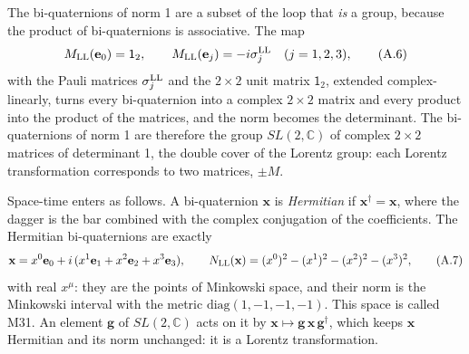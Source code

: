 \documentclass[
  10pt,
]{article}
\begin{document}
The bi-quaternions of norm 1 are a subset of the loop that \emph{is} a
group, because the product of bi-quaternions is associative. The map
\[M_{\rm LL}(\mathbf e_0)=\mathsf 1_2,\qquad M_{\rm LL}(\mathbf e_j)=-i\sigma^{\rm LL}_j\quad(j=1,2,3),\tag{A.6}\]
with the Pauli matrices \(\sigma^{\rm LL}_j\) and the \(2\times2\) unit
matrix \(\mathsf 1_2\), extended complex-linearly, turns every
bi-quaternion into a complex \(2\times2\) matrix and every product into
the product of the matrices, and the norm becomes the determinant. The
bi-quaternions of norm 1 are therefore the group \(SL(2,\mathbb C)\) of
complex \(2\times2\) matrices of determinant 1, the double cover of the
Lorentz group: each Lorentz transformation corresponds to two matrices,
\(\pm M\).

Space-time enters as follows. A bi-quaternion \(\mathbf x\) is
\emph{Hermitian} if \(\mathbf x^\dagger=\mathbf x\), where the dagger is
the bar combined with the complex conjugation of the coefficients. The
Hermitian bi-quaternions are exactly
\[\mathbf x=x^0\mathbf e_0+i\,(x^1\mathbf e_1+x^2\mathbf e_2+x^3\mathbf e_3),\qquad N_{\rm LL}(\mathbf x)=(x^0)^2-(x^1)^2-(x^2)^2-(x^3)^2,\tag{A.7}\]
with real \(x^\mu\): they are the points of Minkowski space, and their
norm is the Minkowski interval with the metric
\(\mathrm{diag}(1,-1,-1,-1)\). This space is called M31. An element
\(\mathbf g\) of \(SL(2,\mathbb C)\) acts on it by
\(\mathbf x\mapsto\mathbf g\,\mathbf x\,\mathbf g^\dagger\), which keeps
\(\mathbf x\) Hermitian and its norm unchanged: it is a Lorentz
transformation.
\end{document}
